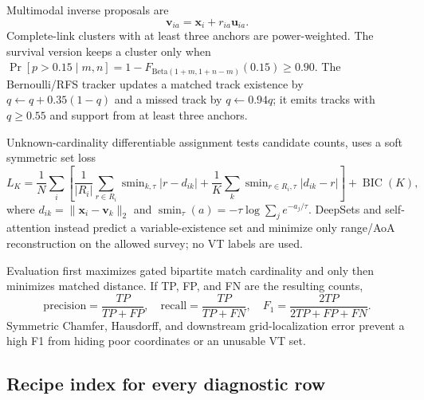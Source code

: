 \documentclass[10pt]{article}
\begin{document}
Multimodal inverse proposals are
\begin{equation}
 \mathbf v_{ia}=\mathbf x_i+r_{ia}\mathbf u_{ia}.
\end{equation}
Complete-link clusters with at least three anchors are power-weighted.  The
survival version keeps a cluster only when
$\Pr[p>0.15\mid m,n]=1-F_{\mathrm{Beta}(1+m,1+n-m)}(0.15)\ge0.90$.
The Bernoulli/RFS tracker updates a matched track existence by
$q\leftarrow q+0.35(1-q)$ and a missed track by $q\leftarrow0.94q$; it emits
tracks with $q\ge0.55$ and support from at least three anchors.

Unknown-cardinality differentiable assignment tests candidate counts, uses a
soft symmetric set loss
\begin{equation}
 L_K=\frac1N\sum_i\left[
 \frac1{|R_i|}\sum_{r\in R_i}\operatorname{smin}_{k,\tau}|r-d_{ik}|+
 \frac1K\sum_k\operatorname{smin}_{r\in R_i,\tau}|d_{ik}-r|\right]
 +\operatorname{BIC}(K),
\end{equation}
where $d_{ik}=\|\mathbf x_i-\mathbf v_k\|_2$ and
$\operatorname{smin}_{\tau}(a)=-\tau\log\sum_j e^{-a_j/\tau}$.  DeepSets and
self-attention instead predict a variable-existence set and minimize only
range/AoA reconstruction on the allowed survey; no VT labels are used.

Evaluation first maximizes gated bipartite match cardinality and only then
minimizes matched distance.  If TP, FP, and FN are the resulting counts,
\begin{equation}
 \mathrm{precision}=\frac{TP}{TP+FP},\quad
 \mathrm{recall}=\frac{TP}{TP+FN},\quad
 F_1=\frac{2TP}{2TP+FP+FN}.
\end{equation}
Symmetric Chamfer, Hausdorff, and downstream grid-localization error prevent a
high F1 from hiding poor coordinates or an unusable VT set.

\subsection{Recipe index for every diagnostic row}
\end{document}
